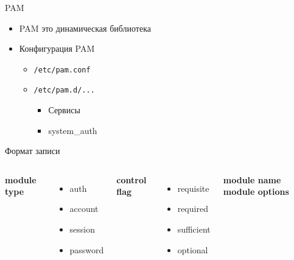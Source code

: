 \begin{frame}{PAM}
	\begin{itemize}
		\item PAM это динамическая библиотека
		\item Конфигурация PAM
			\begin{itemize}
				\item {\tt /etc/pam.conf}
				\item {\tt /etc/pam.d/...}
					\begin{itemize}
						\item Сервисы
						\item system\_auth
					\end{itemize}
			\end{itemize}
	\end{itemize}

	\begin{block}{Формат записи}
		\begin{columns}
			\textbf{module type}
			 \begin{itemize}
				 \item auth
				 \item account
				 \item session
				 \item password
			 \end{itemize}
			 \textbf{control flag}
			 \begin{itemize}
				 \item requisite
				 \item required
				 \item sufficient
				 \item optional
			 \end{itemize}
			 \textbf{module name}
			 \textbf{module options}
		 \end{columns}
	 \end{block}
\end{frame}

